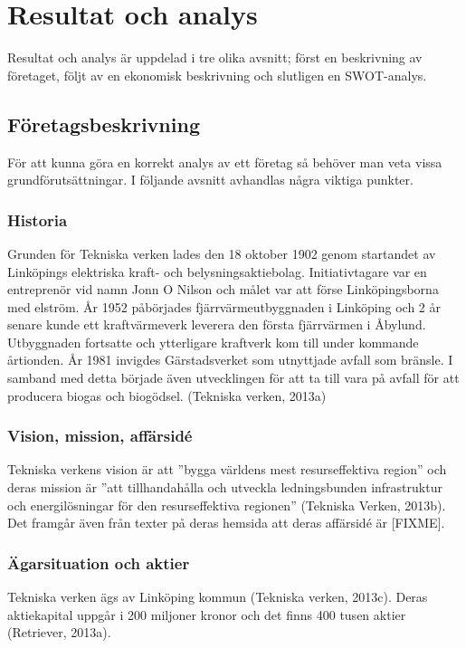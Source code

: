 \documentclass[10pt,a4paper]{article}
\begin{document}
\section{Resultat och analys}
Resultat och analys är uppdelad i tre olika avsnitt; först en beskrivning av
företaget, följt av en ekonomisk beskrivning och slutligen en SWOT-analys.

\subsection{Företagsbeskrivning}
För att kunna göra en korrekt analys av ett företag så behöver man veta vissa
grundförutsättningar. I följande avsnitt avhandlas några viktiga punkter. 

\subsubsection{Historia}
Grunden för Tekniska verken lades den 18 oktober 1902 genom startandet av
Linköpings elektriska kraft- och belysningsaktiebolag. Initiativtagare var en
entreprenör vid namn Jonn O Nilson och målet var att förse Linköpingsborna med
elström. År 1952 påbörjades fjärrvärmeutbyggnaden i Linköping och 2 år senare
kunde ett kraftvärmeverk leverera den första fjärrvärmen i Åbylund. Utbyggnaden
fortsatte och ytterligare kraftverk kom till under kommande årtionden. År 1981 
invigdes Gärstadsverket som utnyttjade avfall som bränsle. I samband med detta
började även utvecklingen för att ta till vara på avfall för att producera biogas 
och biogödsel. (Tekniska verken, 2013a) 

\subsubsection{Vision, mission, affärsidé}
Tekniska verkens vision är att ''bygga världens mest resurseffektiva
region'' och deras mission är ''att tillhandahålla och utveckla
ledningsbunden infrastruktur och energilösningar för den
resurseffektiva regionen'' (Tekniska Verken, 2013b). Det framgår även
från texter på deras hemsida att deras affärsidé är [FIXME].

\subsubsection{Ägarsituation och aktier}
Tekniska verken ägs av Linköping kommun (Tekniska verken, 2013c). Deras
aktiekapital uppgår i 200 miljoner kronor och det finns 400 tusen
aktier (Retriever, 2013a).
\end{document}
